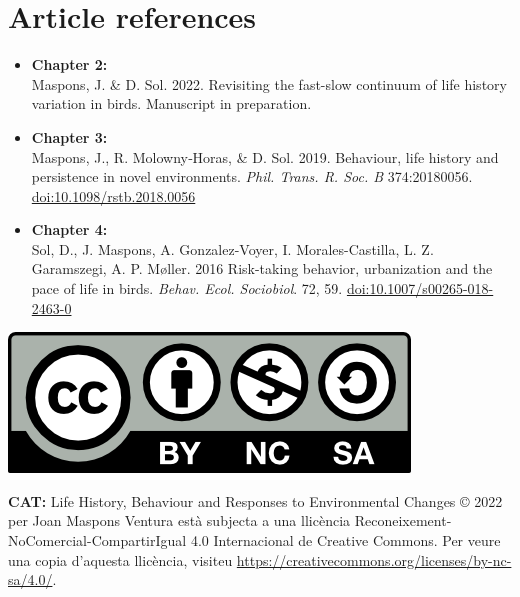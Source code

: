 \documentclass[12pt,a4paper,twoside,fleqn]{memoir}
\begin{document}
\section*{Article references}

\begin{itemize}
  \item \textbf{Chapter 2:} \\
  Maspons, J. \& D. Sol. 2022. Revisiting the fast-slow continuum of life history variation in birds. Manuscript in preparation.
  
  \item \textbf{Chapter 3:} \\
  Maspons, J., R. Molowny‐Horas, \& D. Sol. 2019. Behaviour, life history and persistence in novel environments. \textit{Phil. Trans. R. Soc. B} 374:20180056. \href{http://dx.doi.org/10.1098/rstb.2018.0056}{doi:10.1098/rstb.2018.0056}
  
  \item \textbf{Chapter 4:} \\
  Sol, D., J. Maspons, A. Gonzalez-Voyer, I. Morales-Castilla, L. Z. Garamszegi, A. P. M\o{}ller. 2016 Risk-taking behavior, urbanization and the pace of life in birds. \textit{Behav. Ecol. Sociobiol}. 72, 59. \href{http://dx.doi.org/10.1007/s00265-018-2463-0}{doi:10.1007/s00265-018-2463-0}

\end{itemize}

\bigskip

\begin{center}
 \includegraphics{./Figures/intro/CC_BY-NC-SA.png}
\end{center}


\textbf{CAT:} Life History, Behaviour and Responses to Environmental Changes
© 2022 per Joan Maspons Ventura està subjecta a una llicència
Reconeixement-NoComercial-CompartirIgual 4.0 Internacional de Creative Commons.
Per veure una copia d'aquesta llicència, visiteu
\url{https://creativecommons.org/licenses/by-nc-sa/4.0/}.
\end{document}
